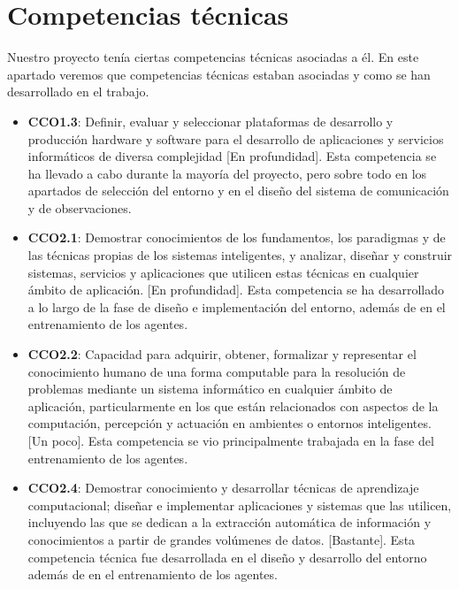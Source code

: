 \section{Competencias técnicas}

Nuestro proyecto tenía ciertas competencias técnicas asociadas a él. En este apartado veremos que competencias técnicas estaban asociadas y como se han desarrollado en el trabajo.

\begin{itemize}
    \item \textbf{CCO1.3}: Definir, evaluar y seleccionar plataformas de desarrollo y producción hardware y software para el desarrollo de aplicaciones y servicios informáticos de diversa complejidad [En profundidad]. Esta competencia se ha llevado a cabo durante la mayoría del proyecto, pero sobre todo en los apartados de selección del entorno y en el diseño del sistema de comunicación y de observaciones.
    \item \textbf{CCO2.1}: Demostrar conocimientos de los fundamentos, los paradigmas y de las técnicas propias de los sistemas inteligentes, y analizar, diseñar y construir sistemas, servicios y aplicaciones que utilicen estas técnicas en cualquier ámbito de aplicación. [En profundidad]. Esta competencia se ha desarrollado a lo largo de la fase de diseño e implementación del entorno, además de en el entrenamiento de los agentes.
    \item \textbf{CCO2.2}: Capacidad para adquirir, obtener, formalizar y representar el conocimiento humano de una forma computable para la resolución de problemas mediante un sistema informático en cualquier ámbito de aplicación, particularmente en los que están relacionados con aspectos de la computación, percepción y actuación en ambientes o entornos inteligentes. [Un poco]. Esta competencia se vio principalmente trabajada en la fase del entrenamiento de los agentes.
    \item \textbf{CCO2.4}: Demostrar conocimiento y desarrollar técnicas de aprendizaje computacional; diseñar e implementar aplicaciones y sistemas que las utilicen, incluyendo las que se dedican a la extracción automática de información y conocimientos a partir de grandes volúmenes de datos. [Bastante]. Esta competencia técnica fue desarrollada en el diseño y desarrollo del entorno además de en el entrenamiento de los agentes.
\end{itemize}